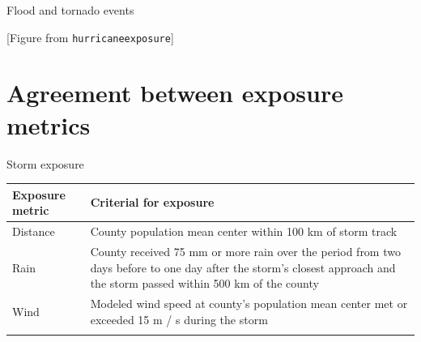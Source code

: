 \documentclass[ignorenonframetext,]{beamer}
\begin{document}
\begin{frame}[fragile]{Flood and tornado events}

{[}Figure from \texttt{hurricaneexposure}{]}

\end{frame}

\section{Agreement between exposure
metrics}\label{agreement-between-exposure-metrics}

\begin{frame}{Storm exposure}

\footnotesize

\begin{longtable}[]{@{}ll@{}}
\toprule
\begin{minipage}[b]{0.24\columnwidth}\raggedright\strut
Exposure metric\strut
\end{minipage} & \begin{minipage}[b]{0.65\columnwidth}\raggedright\strut
Criterial for exposure\strut
\end{minipage}\tabularnewline
\midrule
\endhead
\begin{minipage}[t]{0.24\columnwidth}\raggedright\strut
Distance\strut
\end{minipage} & \begin{minipage}[t]{0.65\columnwidth}\raggedright\strut
County population mean center within 100 km of storm track\strut
\end{minipage}\tabularnewline
\begin{minipage}[t]{0.24\columnwidth}\raggedright\strut
Rain\strut
\end{minipage} & \begin{minipage}[t]{0.65\columnwidth}\raggedright\strut
County received 75 mm or more rain over the period from two days before
to one day after the storm's closest approach and the storm passed
within 500 km of the county\strut
\end{minipage}\tabularnewline
\begin{minipage}[t]{0.24\columnwidth}\raggedright\strut
Wind\strut
\end{minipage} & \begin{minipage}[t]{0.65\columnwidth}\raggedright\strut
Modeled wind speed at county's population mean center met or exceeded 15
m / s during the storm\strut
\end{minipage}\tabularnewline
\begin{minipage}[t]{0.24\columnwidth}\raggedright\strut

\end{minipage}
\end{longtable}
\end{frame}
\end{document}
